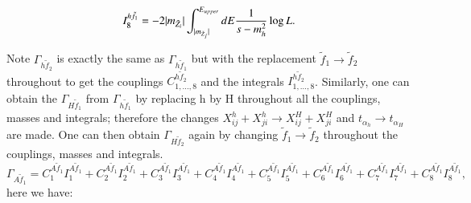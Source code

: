 \documentclass[final,3p,times]{elsarticle}
\begin{document}
\begin{equation}
I_{8}^{h \tilde{f}_1} = -2|m_{\tilde{Z}_i}|\int_{|m_{\tilde{Z}_j}|}^{E_{upper}} dE {1 \over s-m_{h}^2} \log L.
\end{equation}

Note $\Gamma_{h \tilde{f}_2}$ is exactly the same as $\Gamma_{h \tilde{f}_1}$ but with the replacement $\tilde{f}_1 \rightarrow \tilde{f}_2$ throughout to get the couplings $C_{1,\ldots,8}^{h \tilde{f}_2}$ and the integrals $I_{1,\ldots,8}^{h \tilde{f}_2}$.
Similarly, one can obtain the $\Gamma_{H \tilde{f}_1}$ from $\Gamma_{h \tilde{f}_1}$ by replacing h by H throughout all the couplings, masses and integrals; therefore the changes $X_{ij}^h + X_{ji}^h \rightarrow X_{ij}^H + X_{ji}^H$ and $t_{\alpha_h} \rightarrow t_{\alpha_H}$ are made. One can then obtain $\Gamma_{H \tilde{f}_2}$ again by changing $\tilde{f}_1 \rightarrow \tilde{f}_2$ throughout the couplings, masses and integrals.
\begin{equation}
\Gamma_{A \tilde{f}_1} = C_{1}^{A \tilde{f}_1} I_{1}^{A \tilde{f}_1} + C_{2}^{A \tilde{f}_1} I_{2}^{A \tilde{f}_1} + C_{3}^{A \tilde{f}_1} I_{3}^{A \tilde{f}_1} + C_{4}^{A \tilde{f}_1} I_{4}^{A \tilde{f}_1} + C_{5}^{A \tilde{f}_1} I_{5}^{A \tilde{f}_1} + C_{6}^{A \tilde{f}_1} I_{6}^{A \tilde{f}_1} + C_{7}^{A \tilde{f}_1} I_{7}^{A \tilde{f}_1} + C_{8}^{A \tilde{f}_1} I_{8}^{A \tilde{f}_1},
\end{equation}
here we have:
\end{document}
